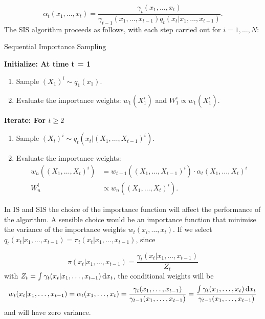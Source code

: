 \begin{equation*}
    \alpha_t (x_1, \dots, x_t) = \frac{\gamma_t (x_1, \dots, x_t)}{\gamma_{t-1} (x_1, \dots, x_{t-1}) q_t(x_t | x_1, \dots, x_{t-1})}.
\end{equation*}
The SIS algorithm proceeds as follows, with each step carried out for $i = 1, \dots, N$:

\begin{algorithm}[H]
\caption{Sequential Importance Sampling}\label{SIS}
    \begin{algorithmic}
        \State  \bf{Initialize:} \normalfont At time t = 1
            \begin{enumerate}
	            \item Sample $(X_{1})^i \sim q_1(x_1)$.
	            \item Evaluate the importance weights: $w_1(X_1^i)$ and $W^i_1 \propto w_1(X_1^i)$.
            \end{enumerate}
        \State  \bf{Iterate:} \normalfont For $t \geq 2$
            \begin{enumerate}
	            \item Sample $(X_{t})^i \sim q_t(x_t | (X_1, \dots, X_{t-1})^i)$.
	            \item Evaluate the importance weights: 
	                \begin{align*}
	                    w_n((X_1, \dots, X_t)^i) & = w_{t-1}((X_1, \dots, X_{t-1})^i) \cdot \alpha_t (X_1, \dots, X_t)^i \\ 
	                    W^i_n & \propto w_n((X_1, \dots, X_t)^i).
	                \end{align*}
	        \end{enumerate}
    \end{algorithmic}
\end{algorithm}

In IS and SIS the choice of the importance function will affect the performance of the algorithm. A sensible choice would be an importance function that minimise the variance of the importance weights $w_t(x_i, \dots, x_t)$. If we select $q_t(x_t | x_1, \dots, x_{t-1}) = \pi_t(x_t | x_1, \dots, x_{t-1})$, since 

\begin{equation*}
    \pi(x_t | x_1, \dots, x_{t-1}) = \frac{\gamma_t(x_t | x_1, \dots, x_{t-1})}{Z_t}
\end{equation*}
with ${Z_t} = \int \gamma_t(x_t | x_1, \dots, x_{t-1}) \operatorname{d}\!{x}_t$, the conditional weights will be
\begin{equation*}
    w_t(x_t | x_1, \dots, x_{t-1}) = \alpha_t(x_1, \dots, x_t) = \frac{\gamma_t(x_1, \dots, x_{t-1})}{\gamma_{t-1}(x_1, \dots, x_{t-1})} = \frac{\int \gamma_t(x_1, \dots, x_t) \operatorname{d}\!{x}_t}{\gamma_{t-1}(x_1, \dots, x_{t-1})}
\end{equation*}
and will have zero variance.







